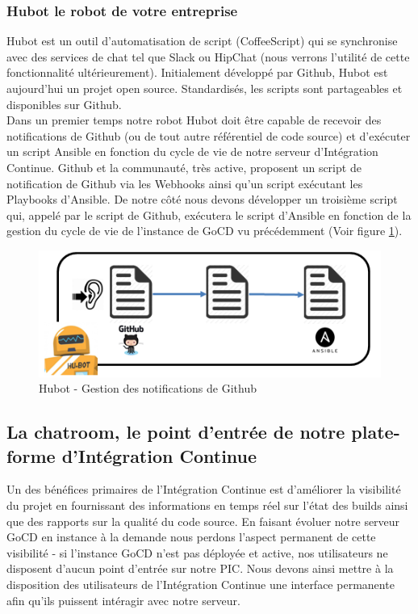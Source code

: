          \subsubsection{Hubot le robot de votre entreprise}\label{Hubot}
          Hubot est un outil d'automatisation de script (CoffeeScript) qui se synchronise avec des services de chat tel que Slack ou HipChat (nous verrons l'utilité de cette fonctionnalité ultérieurement). Initialement développé par Github, Hubot est aujourd'hui un projet open source. Standardisés, les scripts sont partageables et disponibles sur Github.\\

          Dans un premier temps notre robot Hubot doit être capable de recevoir des notifications de Github (ou de tout autre référentiel de code source) et d'exécuter un script Ansible en fonction du cycle de vie de notre serveur d'Intégration Continue. Github et la communauté, très active, proposent un script de notification de Github via les Webhooks ainsi qu'un script exécutant les Playbooks d'Ansible. De notre côté nous devons développer un troisième script qui, appelé par le script de Github, exécutera le script d'Ansible en fonction de la gestion du cycle de vie de l'instance de GoCD vu précédemment (Voir figure \ref{HubotScripts1}).\\

          \begin{figure}
            \begin{center}
              \includegraphics[scale=0.7]{images/HubotScripts1.png}
            \end{center}
            \caption{Hubot - Gestion des notifications de Github}
            \label{HubotScripts1}
          \end{figure}

      \subsection{La chatroom, le point d'entrée de notre plate-forme d'Intégration Continue}
      Un des bénéfices primaires de l'Intégration Continue est d'améliorer la visibilité du projet en fournissant des informations en temps réel sur l'état des builds ainsi que des rapports sur la qualité du code source. En faisant évoluer notre serveur GoCD en instance à la demande nous perdons l'aspect permanent de cette visibilité - si l'instance GoCD n'est pas déployée et active, nos utilisateurs ne disposent d'aucun point d'entrée sur notre PIC. Nous devons ainsi mettre à la disposition des utilisateurs de l'Intégration Continue une interface permanente afin qu'ils puissent intéragir avec notre serveur.\\

